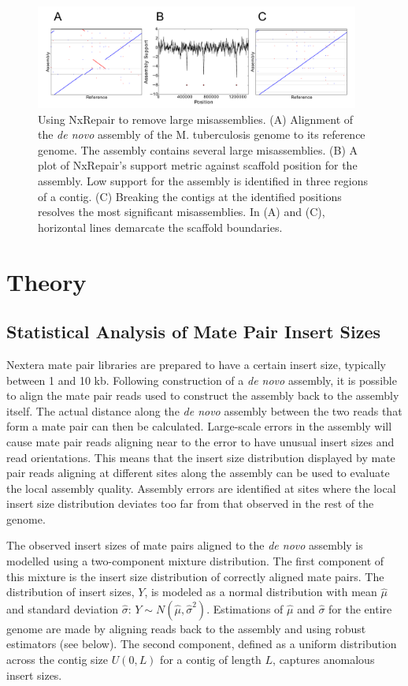 \begin{figure}
\centerline{\includegraphics[width=0.95\textwidth]{illumina/fig1_nxrepair.pdf}}
\caption{Using NxRepair to remove large misassemblies. (A) Alignment of the \textit{de novo} assembly of the M. tuberculosis genome to its reference genome. The assembly contains several large misassemblies. (B) A plot of NxRepair's support metric against scaffold position for the assembly. Low support for the assembly is identified in three regions of a contig. (C) Breaking the contigs at the identified positions resolves the most significant misassemblies. In (A) and (C), horizontal lines demarcate the scaffold boundaries.}\label{fig:NxRepair}
\end{figure}

\clearpage

\section{Theory}
\subsection{Statistical Analysis of Mate Pair Insert Sizes}
\label{sect:illumina_theory}
Nextera mate pair libraries are prepared to have a certain insert size, typically between 1 and 10 kb. Following construction of a \textit{de novo} assembly, it is possible to align the mate pair reads used to construct the assembly back to the assembly itself. The actual distance along the \textit{de novo} assembly between the two reads that form a mate pair can then be calculated. Large-scale errors in the assembly will cause mate pair reads aligning near to the error to have unusual insert sizes and read orientations. This means that the insert size distribution displayed by mate pair reads aligning at different sites along the assembly can be used to evaluate the local assembly quality. Assembly errors are identified at sites where the local insert size distribution deviates too far from that observed in the rest of the genome.       

The observed insert sizes of mate pairs aligned to the \textit{de novo} assembly  is modelled using a two-component mixture distribution. The first component of this mixture is the insert size distribution of correctly aligned mate pairs.  The distribution of insert sizes, $Y$, is modeled as a normal distribution with mean $\hat{\mu}$ and standard deviation $\hat{\sigma}$: $Y \sim N(\hat{\mu},\hat{\sigma}^2).$ Estimations of $\hat{\mu}$ and $\hat{\sigma}$ for the entire genome are made by aligning reads back to the assembly and using robust estimators (see below). The second component, defined as a uniform distribution across the contig size $U(0,L)$ for a contig of length $L$, captures anomalous insert sizes. 

